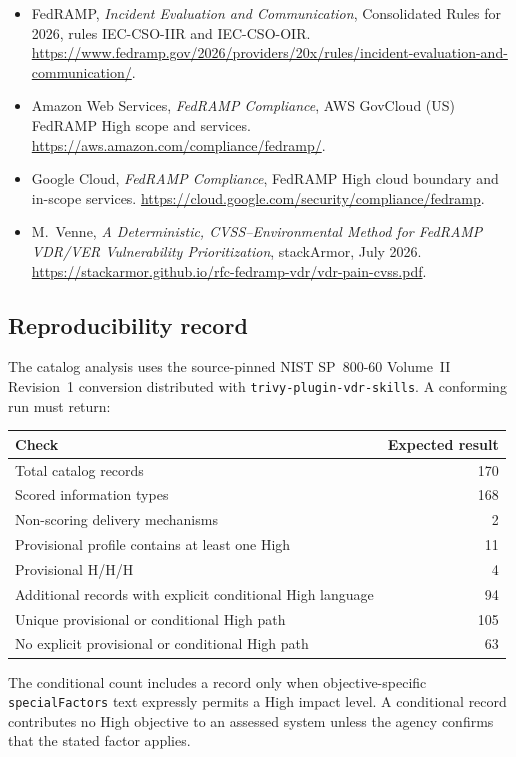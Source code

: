 \documentclass[11pt]{article}
\newcommand{\code}[1]{\texttt{#1}}
\begin{document}
{\begin{itemize}[leftmargin=3.2em,itemsep=0.18em,topsep=0.3em]
  Consolidated Rules for 2026, rule VDR-TFR-PVR.
  \url{https://www.fedramp.gov/2026/providers/20x/rules/vulnerability-detection-and-response/}.
\item[{[FEDRAMP-IEC]}] FedRAMP, \emph{Incident Evaluation and Communication},
  Consolidated Rules for 2026, rules IEC-CSO-IIR and IEC-CSO-OIR.
  \url{https://www.fedramp.gov/2026/providers/20x/rules/incident-evaluation-and-communication/}.
\item[{[AWS-HIGH]}] Amazon Web Services, \emph{FedRAMP Compliance}, AWS GovCloud
  (US) FedRAMP High scope and services.
  \url{https://aws.amazon.com/compliance/fedramp/}.
\item[{[GCP-HIGH]}] Google Cloud, \emph{FedRAMP Compliance}, FedRAMP High cloud
  boundary and in-scope services.
  \url{https://cloud.google.com/security/compliance/fedramp}.
\item[{[PAIN]}] M.~Venne, \emph{A Deterministic, CVSS--Environmental Method for
  FedRAMP VDR/VER Vulnerability Prioritization}, stackArmor, July 2026.
  \url{https://stackarmor.github.io/rfc-fedramp-vdr/vdr-pain-cvss.pdf}.
\end{itemize}
}

\subsection*{Reproducibility record}

The catalog analysis uses the source-pinned NIST SP~800-60 Volume~II Revision~1
conversion distributed with \code{trivy-plugin-vdr-skills}. A conforming run must
return:

\begin{center}
\small
\begin{tabular}{@{}lr@{}}
\toprule
\textbf{Check} & \textbf{Expected result} \\
\midrule
Total catalog records & 170 \\
Scored information types & 168 \\
Non-scoring delivery mechanisms & 2 \\
Provisional profile contains at least one High & 11 \\
Provisional H/H/H & 4 \\
Additional records with explicit conditional High language & 94 \\
Unique provisional or conditional High path & 105 \\
No explicit provisional or conditional High path & 63 \\
\bottomrule
\end{tabular}
\end{center}

The conditional count includes a record only when objective-specific
\code{specialFactors} text expressly permits a High impact level. A conditional
record contributes no High objective to an assessed system unless the agency
confirms that the stated factor applies.
\end{document}
